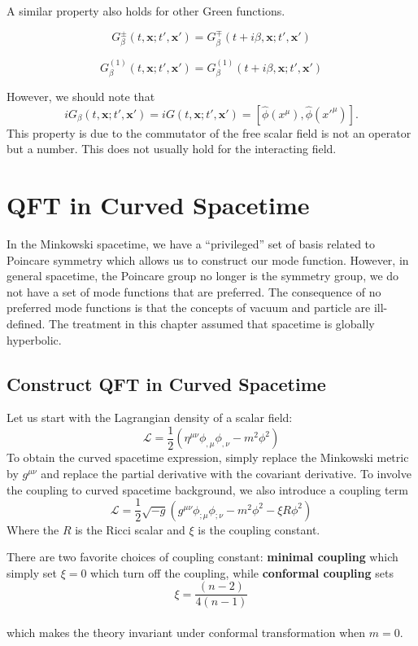 \documentclass[12pt]{article}
\numberwithin{equation}{subsection}
\theoremstyle{mystyle}{\newtheorem{definition}{Definition}[subsection]}
\theoremstyle{mystyle}{\newtheorem{theorem}[definition]{Theorem}}
\theoremstyle{mystyle}{\newtheorem*{remark}{Remark}}
\theoremstyle{mystyle}{\newtheorem{example}{Example}[subsection]}
\theoremstyle{mystyle}{\newtheorem{examples}{Examples}[subsection]}
\theoremstyle{mystyle}{\newtheorem{cthm}{}[subsection]}
\begin{document}
A similar property also holds for other Green functions.
\begin{example}
  \[G^{\pm}_{\beta}(t,\mathbf{x};t',\mathbf{x'})=G^{\mp}_{\beta}(t+i\beta,\mathbf{x};t',\mathbf{x'})\]
\end{example}

\begin{example}
  \[G_{\beta}^{(1)}(t,\mathbf{x};t',\mathbf{x'})=G_{\beta}^{(1)}(t+i\beta,\mathbf{x};t',\mathbf{x'})\]
\end{example}
However, we should note that
\begin{equation}
  iG_{\beta}(t,\mathbf{x};t',\mathbf{x'})=iG(t,\mathbf{x};t',\mathbf{x'})=\left[\hat{\phi}(x^{\mu}),\hat{\phi}(x'^{\mu})\right].
\end{equation}
This property is due to the commutator of the free scalar field is not an operator but a number.
This does not usually hold for the interacting field.






\newpage

\section{QFT in Curved Spacetime}
In the Minkowski spacetime, we have a ``privileged'' set of basis related to Poincare symmetry which allows us to construct our mode function.
However, in general spacetime, the Poincare group no longer is the symmetry group, we do not have a set of mode functions that are preferred.
The consequence of no preferred mode functions is that the concepts of vacuum and particle are ill-defined.
The treatment in this chapter assumed that spacetime is globally hyperbolic.

\subsection{Construct QFT in Curved Spacetime}
Let us start with the Lagrangian density of a scalar field:
\[\mathcal{L} = \frac{1}{2}(\eta^{\mu\nu} \phi_{,\mu} \phi_{,\nu}- m^2 \phi^2)\]
To obtain the curved spacetime expression,
simply replace the Minkowski metric by \(g^{\mu\nu}\) and replace the partial derivative with the covariant derivative.
To involve the coupling to curved spacetime background, we also introduce a coupling term
\begin{equation}
  \mathcal{L} = \frac{1}{2}\sqrt{-g}(g^{\mu\nu} \phi_{;\mu} \phi_{;\nu}- m^2 \phi^2-\xi R \phi^2)
\end{equation}
Where the \(R\) is the Ricci scalar and \(\xi\) is the coupling constant.\par
There are two favorite choices of coupling constant:
\textbf{minimal coupling} which simply set \(\xi=0\) which turn off the coupling,
while \textbf{conformal coupling} sets \[\xi = \frac{(n-2)}{4(n-1)}\]\\
which makes the theory invariant under conformal transformation when \(m=0\).
\end{document}
